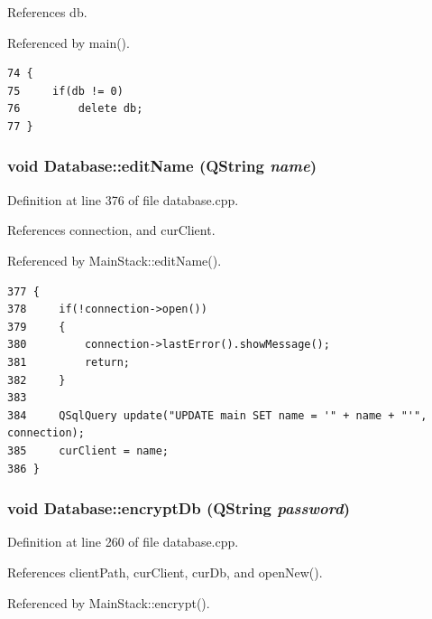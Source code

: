 References db.

Referenced by main().

\footnotesize\begin{verbatim}74 {
75     if(db != 0)
76         delete db;
77 }
\end{verbatim}\normalsize 


\hypertarget{classDatabase_a9}{
\subsubsection[editName]{\setlength{\rightskip}{0pt plus 5cm}void Database::edit\-Name (QString {\em name})}}
\label{classDatabase_a9}


Definition at line 376 of file database.cpp.

References connection, and cur\-Client.

Referenced by Main\-Stack::edit\-Name().

\footnotesize\begin{verbatim}377 {
378     if(!connection->open())
379     {
380         connection->lastError().showMessage();
381         return;
382     }
383     
384     QSqlQuery update("UPDATE main SET name = '" + name + "'", connection);
385     curClient = name;
386 }
\end{verbatim}\normalsize 


\hypertarget{classDatabase_a5}{
\subsubsection[encryptDb]{\setlength{\rightskip}{0pt plus 5cm}void Database::encrypt\-Db (QString {\em password})}}
\label{classDatabase_a5}


Definition at line 260 of file database.cpp.

References client\-Path, cur\-Client, cur\-Db, and open\-New().

Referenced by Main\-Stack::encrypt().

